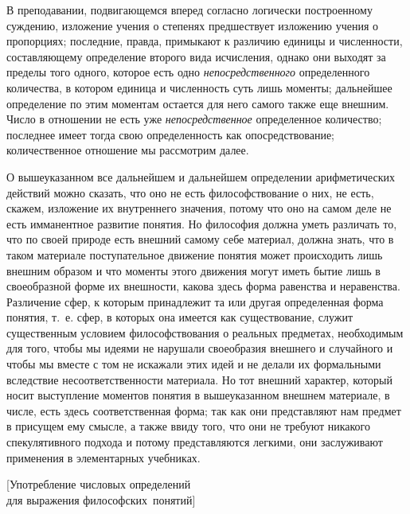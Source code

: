 В преподавании, подвигающемся вперед согласно логически построенному суждению,
изложение учения о степенях предшествует изложению учения о пропорциях;
последние, правда, примыкают к различию единицы и численности, составляющему
определение второго вида исчисления, однако они выходят за пределы того одного,
которое есть одно {\em непосредственного} определенного количества, в котором
единица и численность суть лишь моменты; дальнейшее определение по этим
моментам остается для него самого также еще внешним. Число в отношении не
есть уже {\em непосредственное} определенное количество; последнее имеет тогда
свою определенность как опосредствование; количественное отношение мы
рассмотрим далее.

О вышеуказанном все дальнейшем и дальнейшем определении арифметических действий
можно сказать, что оно не есть философствование о них, не есть, скажем,
изложение их внутреннего значения, потому что оно на самом деле не есть
имманентное развитие понятия. Но философия должна уметь различать то, что по
своей природе есть внешний самому себе материал, должна знать, что в таком
материале поступательное движение понятия может происходить лишь внешним
образом и что моменты этого движения могут иметь бытие лишь в своеобразной
форме их внешности, какова здесь форма равенства и неравенства. Различение
сфер, к которым принадлежит та или другая определенная форма понятия, т.~е.
сфер, в которых она имеется как существование, служит существенным условием
философствования о реальных предметах, необходимым для того, чтобы мы идеями не
нарушали своеобразия внешнего и случайного и чтобы мы вместе с том не искажали
этих идей и не делали их формальными вследствие несоответственности материала.
Но тот внешний характер, который носит выступление моментов понятия в
вышеуказанном внешнем материале, в числе, есть здесь соответственная форма; так
как они представляют нам предмет в присущем ему смысле, а также ввиду того, что
они не требуют никакого спекулятивного подхода и потому представляются легкими,
они заслуживают применения в элементарных учебниках.

%
{[Употребление числовых определений\\ для выражения философских~понятий]}

